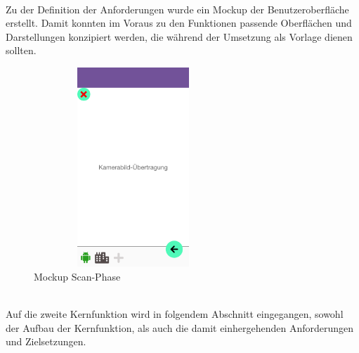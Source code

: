 \\ 
\linebreak
Zu der Definition der Anforderungen wurde ein Mockup der Benutzeroberfläche erstellt. Damit konnten im Voraus zu den Funktionen passende Oberflächen und 
Darstellungen konzipiert werden, die während der Umsetzung als Vorlage dienen sollten. 
\\
\linebreak
\begin{figure}[hbt!]
    \centering
    \includegraphics[width=7.5cm,height=7.5cm,keepaspectratio]{3Konzeption/Bilder/Scan-Phase_AugmIS.png}
    \caption{Mockup Scan-Phase}
    \label{pic:Mockscan}
\end{figure}
\\
Auf die zweite Kernfunktion wird in folgendem Abschnitt eingegangen, sowohl der Aufbau der Kernfunktion, als auch die damit einhergehenden 
Anforderungen und Zielsetzungen.


